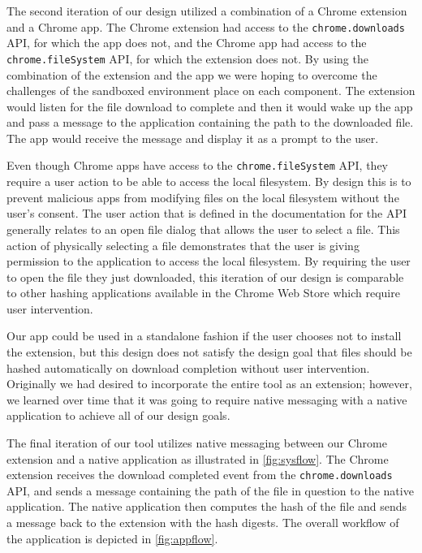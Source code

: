 \documentclass[letterpaper,twocolumn,10pt]{article}
\begin{document}
The second iteration of our design utilized a combination of a Chrome extension and a Chrome app.
The Chrome extension had access to the \texttt{chrome.downloads} API, for which the app does not,
and the Chrome app had access to the \texttt{chrome.fileSystem} API, for which the extension does not.
By using the combination of the extension and the app we were hoping to overcome the challenges of the
sandboxed environment place on each component. The extension would listen for the file download to
complete and then it would wake up the app and pass a message to the application containing the
path to the downloaded file. The app would receive the message and display it as a prompt to the user.

Even though Chrome apps have access to the \texttt{chrome.fileSystem} API, they require a user
action to be able to access the local filesystem. By design this is to prevent malicious apps from
modifying files on the local filesystem without the user’s consent. The user action that is defined
in the documentation for the API generally relates to an open file dialog that allows the user to select
a file. This action of physically selecting a file demonstrates that the user is giving permission to the
application to access the local filesystem. By requiring the user to open the file they just downloaded,
this iteration of our design is comparable to other hashing applications available in the Chrome
Web Store which require user intervention. 

Our app could be used in a standalone fashion if
the user chooses not to install the extension, but this design does not satisfy the design goal
that files should be hashed automatically on download completion without user intervention.
Originally we had desired to incorporate the entire tool as an extension; however, we learned
over time that it was going to require native messaging with a native application to achieve all
of our design goals.


The final iteration of our tool utilizes native messaging between our Chrome extension and a
native application as illustrated in \autoref{fig:sysflow}. The Chrome extension receives the download completed event from the
\texttt{chrome.downloads} API, and sends a message containing the path of the file in question
to the native application. The native application then computes the hash of the file and
sends a message back to the extension with the hash digests. The overall workflow of the application is depicted in \autoref{fig:appflow}.
\end{document}
